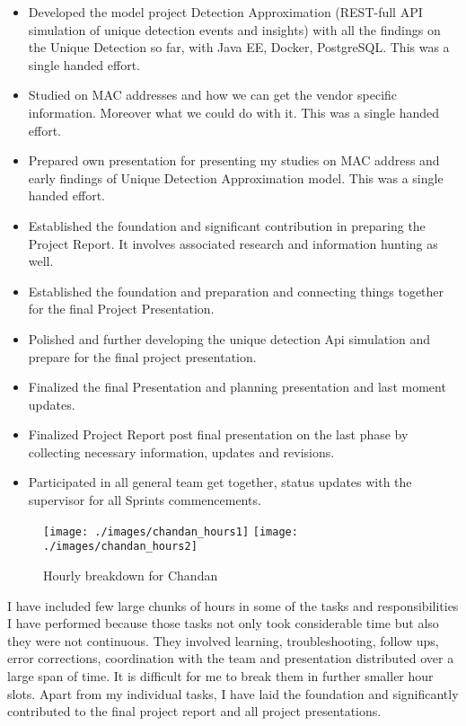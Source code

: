 \begin{itemize}
	\item Developed the model project Detection Approximation (REST-full API simulation of unique detection events and insights) with all the findings on the Unique Detection so far, with Java EE, Docker, PostgreSQL. This was a single handed effort.
	\item Studied on MAC addresses and how we can get the vendor specific information. Moreover what we could do with it. This was a single handed effort.
	\item Prepared own presentation for presenting my studies on MAC address and early findings of Unique Detection Approximation model. This was a single handed effort.
	\item Established the foundation and significant contribution in preparing the Project Report. It involves associated research and information hunting as well.
	\item Established the foundation and preparation and connecting things together for the final Project Presentation.
	\item Polished and further developing the unique detection Api simulation and prepare for the final project presentation.
	\item Finalized the final Presentation and planning presentation and last moment updates.
	\item Finalized Project Report post final presentation on the last phase by collecting necessary information, updates and revisions.
	\item Participated in all general team get together, status updates with the supervisor for all Sprints commencements. 
\end{itemize}

\begin{figure}[H]
	\centering
	\texttt{[image: ./images/chandan\_hours1]}
	\texttt{[image: ./images/chandan\_hours2]}
	\caption{Hourly breakdown for Chandan}
\end{figure}
I have included few large chunks of hours in some of the tasks and responsibilities I have performed because those tasks not only took considerable time but also they were not continuous. They involved learning, troubleshooting, follow ups, error corrections, coordination with the team and presentation distributed over a large span of time. It is difficult for me to break them in further smaller hour slots. Apart from my individual tasks, I have laid the foundation and significantly contributed to the final project report and all project presentations.

